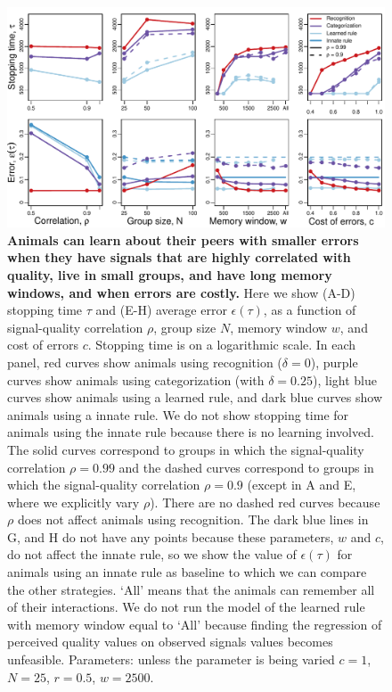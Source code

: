 \begin{figure}
\includegraphics[width=6.85in]{figures/parameters_exploration.pdf}
\caption{\sffamily\small\textbf{Animals can learn about their peers with smaller errors when they have signals that are highly correlated with quality, live in small groups, and have long memory windows, and when errors are costly.} Here we show (A-D) stopping time $\tau$ and (E-H) average error $\epsilon(\tau)$, as a function of signal-quality correlation $\rho$, group size $N$, memory window $w$, and cost of errors $c$. Stopping time is on a logarithmic scale. In each panel, red curves show animals using recognition ($\delta=0$), purple curves show animals using categorization (with $\delta=0.25$), light blue curves show animals using a learned rule, and dark blue curves show animals using a innate rule. We do not show stopping time for animals using the innate rule because there is no learning involved.  The solid curves correspond to groups in which the signal-quality correlation $\rho=0.99$ and the dashed curves correspond to groups in which the signal-quality correlation $\rho=0.9$ (except in A and E, where we explicitly vary $\rho$). There are no dashed red curves because $\rho$ does not affect animals using recognition. The dark blue lines in G, and H do not have any points because these parameters, $w$ and $c$, do not affect the innate rule, so we show the value of $\epsilon(\tau)$ for animals using an innate rule as baseline to which we can compare the other strategies. `All' means that the animals can remember all of their interactions. We do not run the model of the learned rule with memory window equal to `All' because finding the regression of perceived quality values on observed signals values becomes unfeasible. Parameters: unless the parameter is being varied $c=1$, $N=25$, $r=0.5$, $w=2500$.}
\label{parameters}
\end{figure}

